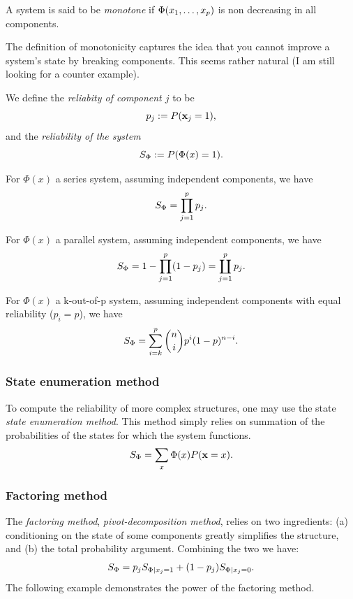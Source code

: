 \begin{definition}
A system is said to be \emph{monotone} if $\Phi(x_1,\dots,x_p)$ is non decreasing in all components.
\end{definition}
The definition of monotonicity captures the idea that you cannot improve a system's state by breaking components.
This seems rather natural (I am still looking for a counter example).






\begin{definition}[Reliability]
We define the \emph{reliabity of component $j$} to be $$p_j:= P(\mathbf{x}_j=1),$$ 
and  the \emph{reliability of the system} 
$$ S_\Phi:=P(\Phi(x)=1).$$
\end{definition}


\begin{example}
For $\Phi(x)$ a series system, assuming independent components, we have
$$ S_\Phi= \prod_{j=1}^{p} p_j.$$
\end{example}


\begin{example}
For $\Phi(x)$ a parallel system, assuming independent components, we have
$$ S_\Phi= 1-\prod_{j=1}^{p} (1-p_j)= \coprod_{j=1}^p p_j. $$
\end{example}


\begin{example}
For $\Phi(x)$ a k-out-of-p system, assuming independent components with equal reliability ($p_i=p$), we have
$$ S_\Phi= \sum_{i=k}^{p} \binom{n}{i} p^i (1-p)^{n-i} .$$
\end{example}



\subsubsection{State enumeration method}
To compute the reliability of more complex structures, one may use the state \emph{state enumeration method}. 
This method simply relies on summation of the probabilities of the states for which the system functions.
$$ S_\Phi= \sum_{x} \Phi(x) P(\mathbf{x}=x).$$


\subsubsection{Factoring method}
The \emph{factoring method}, \aka \emph{pivot-decomposition method}, relies on two ingredients: 
(a) conditioning on the state of some components greatly simplifies the structure, and
(b) the total probability argument.
Combining the two we have:
$$ S_\Phi= p_j  S_{\Phi|x_j=1} + (1-p_j) S_{\Phi|x_j=0}   .$$
The following example demonstrates the power of the factoring method.

